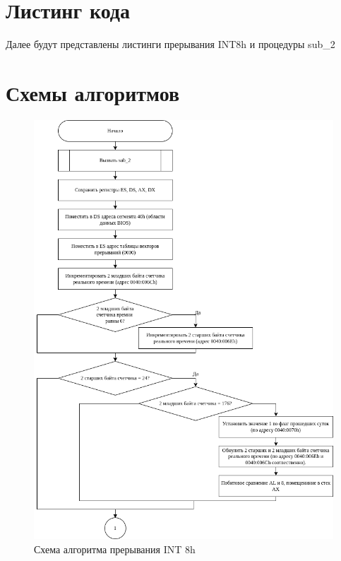 
\section{Листинг кода}

Далее будут представлены листинги прерывания INT8h и процедуры sub\_2




\section{Схемы алгоритмов}

\begin{figure}[h!]
	\begin{center}
		\includegraphics[scale=0.6]{../../INT8.drawio.png}
		\caption{Схема алгоритма прерывания INT 8h}
	\end{center}
\end{figure}

